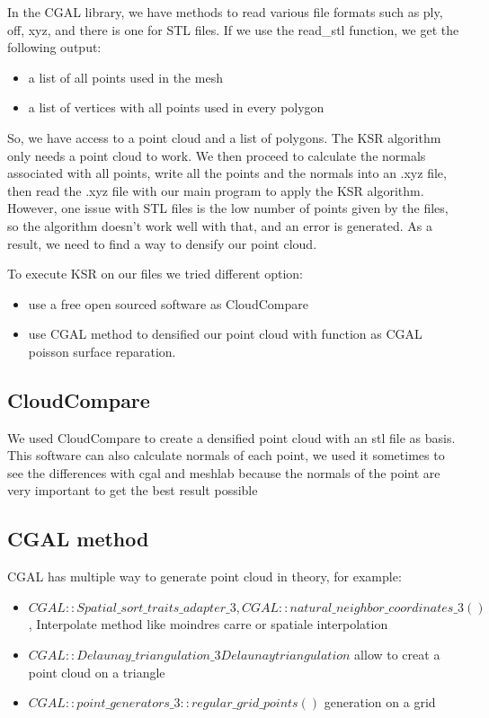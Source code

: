\documentclass{article}
\begin{document}
In the CGAL library, we have methods to read various file formats such as ply, off, xyz, and there is one for STL files. If we use the read\_stl function, we get the following output:

\begin{itemize}
  \item a list of all points used in the mesh
  \item a list of vertices with all points used in every polygon
\end{itemize}

So, we have access to a point cloud and a list of polygons. The KSR algorithm only needs a point cloud to work.
We then proceed to calculate the normals associated with all points, write all the points and the normals into an .xyz file, then read the .xyz file with our main program to apply the KSR algorithm.
However, one issue with STL files is the low number of points given by the files, so the algorithm doesn't work well with that, and an error is generated.
As a result, we need to find a way to densify our point cloud.

To execute KSR on our files we tried different option:

\begin{itemize}
  \item use a free open sourced software as CloudCompare  
  \item use CGAL method to densified our point cloud with function as CGAL poisson surface reparation.
\end{itemize}

\subsection{CloudCompare}
We used CloudCompare to create a densified point cloud with an stl file as basis.
This software can also calculate normals of each point, we used it sometimes to 
see the differences with cgal and meshlab because the normals of the point are very important to get the best result possible 



\subsection{CGAL method}
CGAL has multiple way to generate point cloud in theory, for example:
\begin{itemize}
  \item $CGAL::Spatial\_sort\_traits\_adapter\_3,CGAL::natural\_neighbor\_coordinates\_3()$, Interpolate method like moindres carre or spatiale interpolation  
  \item $CGAL::Delaunay\_triangulation\_3 Delaunay triangulation$ allow to creat a point cloud on a triangle  
  \item $CGAL::point\_generators\_3::regular\_grid\_points()$ generation on a grid 
\end{itemize}
\end{document}
